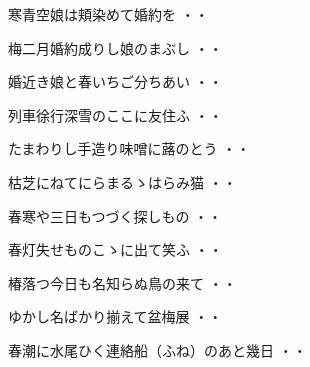 \vspace{0.6cm}
\begin{shiika}寒青空娘は頬染めて婚約を
\hfill{・・}\end{shiika}
\vspace{0.6cm}
\begin{shiika}梅二月婚約成りし娘のまぶし
\hfill{・・}\end{shiika}
\vspace{0.6cm}
\begin{shiika}婚近き娘と春いちご分ちあい
\hfill{・・}\end{shiika}
\vspace{0.6cm}
\begin{shiika}列車徐行深雪のここに友住ふ
\hfill{・・}\end{shiika}
\vspace{0.6cm}
\begin{shiika}たまわりし手造り味噌に蕗のとう
\hfill{・・}\end{shiika}
\vspace{0.6cm}
\begin{shiika}枯芝にねてにらまるゝはらみ猫
\hfill{・・}\end{shiika}
\vspace{0.6cm}
\begin{shiika}春寒や三日もつづく探しもの
\hfill{・・}\end{shiika}
\vspace{0.6cm}
\begin{shiika}春灯失せものこゝに出て笑ふ
\hfill{・・}\end{shiika}
\vspace{0.6cm}
\begin{shiika}椿落つ今日も名知らぬ鳥の来て
\hfill{・・}\end{shiika}
\vspace{0.6cm}
\begin{shiika}ゆかし名ばかり揃えて盆梅展
\hfill{・・}\end{shiika}
\vspace{0.6cm}
\begin{shiika}春潮に水尾ひく連絡船（ふね）のあと幾日
\hfill{・・}\end{shiika}
